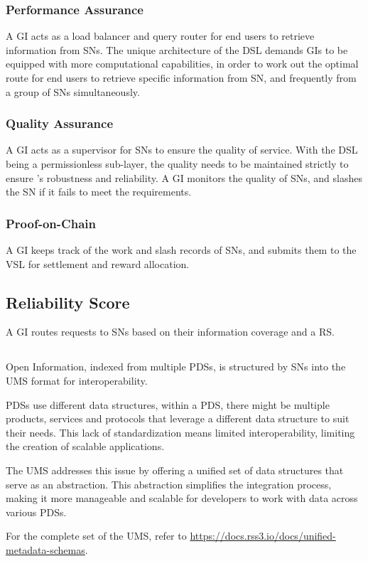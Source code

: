 \subsubsection{Performance Assurance} A GI acts as a load balancer and query router for end users to retrieve information from \glspl{SN}.
The unique architecture of the \gls{DSL} demands \glspl{GI} to be equipped with more computational capabilities, in order to work out the optimal route for end users to retrieve specific information from \gls{SN}, and frequently from a group of \glspl{SN} simultaneously.

\subsubsection{Quality Assurance} A GI acts as a supervisor for \glspl{SN} to ensure the quality of service.
With the \gls{DSL} being a permissionless sub-layer, the quality needs to be maintained strictly to ensure 's robustness and reliability.
A \gls{GI} monitors the quality of \glspl{SN}, and slashes the \gls{SN} if it fails to meet the requirements.

\subsubsection{Proof-on-Chain} A GI keeps track of the work and slash records of \glspl{SN}, and submits them to the \gls{VSL} for settlement and reward allocation.

\subsection{Reliability Score} 

A \gls{GI} routes requests to \glspl{SN} based on their information coverage and a \gls{RS}.

\subsection{}
\label{subsec:UMS}

Open Information, indexed from multiple \glspl{PDS}, is structured by \glspl{SN} into the \gls{UMS} format for interoperability.

\glspl{PDS} use different data structures, within a \gls{PDS}, there might be multiple products, services and protocols that leverage a different data structure to suit their needs.
This lack of standardization means limited interoperability, limiting the creation of scalable applications.

The \gls{UMS} addresses this issue by offering a unified set of data structures that serve as an abstraction.
This abstraction simplifies the integration process, making it more manageable and scalable for developers to work with data across various \glspl{PDS}.

For the complete set of the \gls{UMS}, refer to \url{https://docs.rss3.io/docs/unified-metadata-schemas}.

